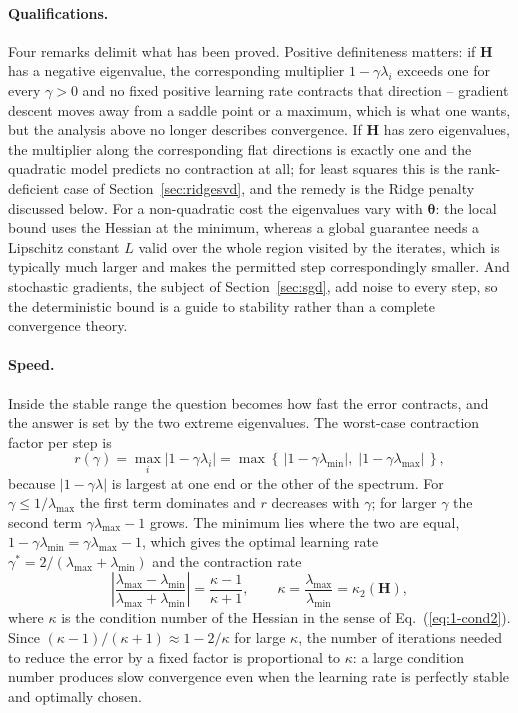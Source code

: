 \paragraph{Qualifications.}
Four remarks delimit what has been proved.  Positive definiteness matters:
if $\bm{H}$ has a negative eigenvalue, the corresponding multiplier
$1-\gamma\lambda_i$ exceeds one for every $\gamma>0$ and no fixed positive
learning rate contracts that direction -- gradient descent moves away from a
saddle point or a maximum, which is what one wants, but the analysis above no
longer describes convergence.  If $\bm{H}$ has zero eigenvalues, the
multiplier along the corresponding flat directions is exactly one and the
quadratic model predicts no contraction at all; for least squares this is the
rank-deficient case of Section~\ref{sec:ridgesvd}, and the remedy is the
Ridge penalty discussed below.  For a non-quadratic cost the eigenvalues vary
with $\bm{\theta}$: the local bound uses the Hessian at the minimum, whereas a
global guarantee needs a Lipschitz constant $L$ valid over the whole region
visited by the iterates, which is typically much larger and makes the
permitted step correspondingly smaller.  And stochastic gradients, the
subject of Section~\ref{sec:sgd}, add noise to every step, so the
deterministic bound is a guide to stability rather than a complete
convergence theory.

\paragraph{Speed.}
Inside the stable range the question becomes how fast the error contracts,
and the answer is set by the two extreme eigenvalues.  The worst-case
contraction factor per step is
\begin{equation*}
  r(\gamma)=\max_i\left|1-\gamma\lambda_i\right|
          =\max\left\{\,\left|1-\gamma\lambda_{\min}\right|,\;
                        \left|1-\gamma\lambda_{\max}\right|\,\right\},
\end{equation*}
because $|1-\gamma\lambda|$ is largest at one end or the other of the
spectrum.  For $\gamma\le1/\lambda_{\max}$ the first term dominates and
$r$ decreases with $\gamma$; for larger $\gamma$ the second term
$\gamma\lambda_{\max}-1$ grows.  The minimum lies where the two are equal,
$1-\gamma\lambda_{\min}=\gamma\lambda_{\max}-1$, which gives the optimal
learning rate $\gamma^{*}=2/(\lambda_{\max}+\lambda_{\min})$ and the
contraction rate
\begin{equation}
  \left|\frac{\lambda_{\max}-\lambda_{\min}}{\lambda_{\max}+\lambda_{\min}}\right|
   = \frac{\kappa-1}{\kappa+1},
  \qquad
  \kappa = \frac{\lambda_{\max}}{\lambda_{\min}} = \kappa_2(\bm{H}),
  \label{eq:4-gdrate}
\end{equation}
where $\kappa$ is the condition number of the Hessian in the sense of
Eq.~(\ref{eq:1-cond2}).  Since $(\kappa-1)/(\kappa+1)\approx1-2/\kappa$ for
large $\kappa$, the number of iterations needed to reduce the error by a fixed
factor is proportional to $\kappa$: a large condition number produces slow
convergence even when the learning rate is perfectly stable and optimally
chosen.

